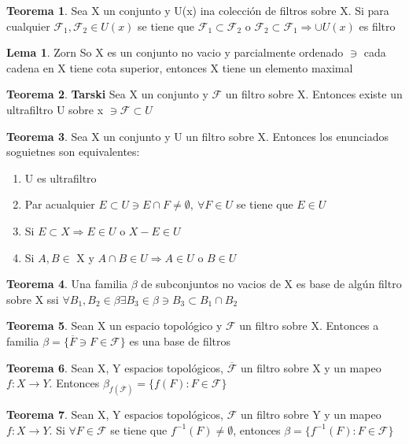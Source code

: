 \documentclass{article}
\theoremstyle{definition}
\newtheorem{theorem}{Teorema}[section]
\newtheorem{lemma}{Lema}[section]
\begin{document}
\begin{theorem}
	Sea X un conjunto y U(x) ina colección de filtros sobre X. Si para cualquier $\mathcal{F}_1,\mathcal{F}_2\in U(x)$ se tiene que $\mathcal{F}_1\subset\mathcal{F}_2$ o $\mathcal{F}_2\subset\mathcal{F}_1\Rightarrow \cup U(x)$ es filtro
\end{theorem}
\begin{lemma}{Zorn}
	So X es un conjunto no vacio y parcialmente ordenado $\ni$ cada cadena en X tiene cota superior, entonces X tiene un elemento maximal
\end{lemma}
\begin{theorem}{\textbf{Tarski}}
	Sea X un conjunto y $\mathcal{F}$ un filtro sobre X. Entonces existe un ultrafiltro U sobre x $\ni \mathcal{F}\subset U$
\end{theorem}
\begin{theorem}
	Sea X un conjunto y U un filtro sobre X. Entonces los enunciados soguietnes son equivalentes:
	\begin{enumerate}
		\item U es ultrafiltro
		\item Par acualquier $E\subset U\ni E\cap F\neq \emptyset,\ \forall F\in U$ se tiene que $E\in U$
		\item Si $E\subset X\Rightarrow E\in U$ o $X-E\in U$
		\item Si $A, B\in$ X y $ A\cap B\in U\Rightarrow A\in U$ o $ B\in U$
	\end{enumerate}
\end{theorem}
\begin{theorem}
	Una familia $\beta$ de subconjuntos no vacios de X es base de algún filtro sobre X ssi $\forall B_1,B_2 \in \beta\exists B_3\in\beta\ni B_3\subset B_1\cap B_2$
\end{theorem}
\begin{theorem}
	Sean X un espacio topológico y $\mathcal{F}$ un filtro sobre X. Entonces a familia $\beta=\{\overline{F}\ni F\in \mathcal{F}\}$ es una base de filtros
\end{theorem}
\begin{theorem}
	Sean X, Y espacios topológicos, $\overline{\mathcal{F}}$ un filtro sobre X y un mapeo $f:X\to Y$. Entonces $\beta_{f(\overline{\mathcal{F}})}=\{f(F):F\in \mathcal{F}\}$
\end{theorem}
\begin{theorem}
	Sean X, Y espacios topológicos, $\mathcal{F}$ un filtro sobre Y y un mapeo $f:X\to Y$. Si $\forall F\in \mathcal{F}$ se tiene que $f^{-1}(F)\neq\emptyset$, entonces $\beta=\{f^{-1}(F):F\in \mathcal{F}\}$
\end{theorem}
\end{document}
